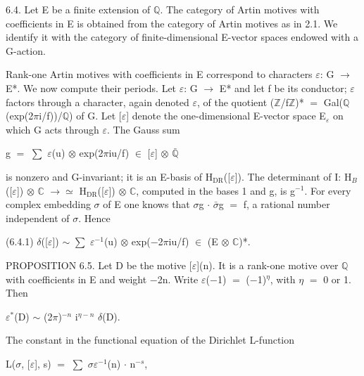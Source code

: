 \documentclass[10pt,twoside]{article}
\begin{document}
6.4. Let E be a finite extension of \ensuremath{ℚ}. The category of Artin motives with coefficients in E is obtained from the category of Artin motives as in 2.1. We identify it with the category of finite-dimensional E-vector spaces endowed with a G-action.\par
Rank-one Artin motives with coefficients in E correspond to characters \ensuremath{ε}: G \ensuremath{→} E*. We now compute their periods. Let \ensuremath{ε}: G \ensuremath{→} E* and let f be its conductor; \ensuremath{ε} factors through a character, again denoted \ensuremath{ε}, of the quotient (\ensuremath{ℤ}/f\ensuremath{ℤ})* \ensuremath{=} Gal(\ensuremath{ℚ}(exp(2\ensuremath{π}i/f))/\ensuremath{ℚ}) of G. Let [\ensuremath{ε}] denote the one-dimensional E-vector space E\ensuremath{_{ε}} on which G acts through \ensuremath{ε}. The Gauss sum\par
g \ensuremath{=} \ensuremath{∑} \ensuremath{ε}(u) \ensuremath{⊗} exp(2\ensuremath{π}iu/f) \ensuremath{∈} [\ensuremath{ε}] \ensuremath{⊗} \ensuremath{\bar{ℚ}}\par
is nonzero and G-invariant; it is an E-basis of H\ensuremath{_{\mathrm{DR}}}([\ensuremath{ε}]). The determinant of I: H\ensuremath{_{B}}([\ensuremath{ε}]) \ensuremath{⊗} \ensuremath{ℂ} \ensuremath{→}\ensuremath{≃} H\ensuremath{_{\mathrm{DR}}}([\ensuremath{ε}]) \ensuremath{⊗} \ensuremath{ℂ}, computed in the bases 1 and g, is g\ensuremath{^{-1}}. For every complex embedding \ensuremath{σ} of E one knows that \ensuremath{σ}g \ensuremath{·} \ensuremath{\bar{σ}}g \ensuremath{=} f, a rational number independent of \ensuremath{σ}. Hence\par
(6.4.1)    \ensuremath{δ}([\ensuremath{ε}]) \ensuremath{∼} \ensuremath{∑} \ensuremath{ε}\ensuremath{^{-1}}(u) \ensuremath{⊗} exp(\ensuremath{−}2\ensuremath{π}iu/f) \ensuremath{∈} (E \ensuremath{⊗} \ensuremath{ℂ})*.\par
PROPOSITION 6.5. Let D be the motive [\ensuremath{ε}](n). It is a rank-one motive over \ensuremath{ℚ} with coefficients in E and weight \ensuremath{−}2n. Write \ensuremath{ε}(\ensuremath{−}1) \ensuremath{=} (\ensuremath{−}1)\ensuremath{^{η}}, with \ensuremath{η} \ensuremath{=} 0 or 1. Then\par
\ensuremath{ε}\ensuremath{^{*}}(D) \ensuremath{∼} (2\ensuremath{π})\ensuremath{^{-n}} i\ensuremath{^{η−n}} \ensuremath{δ}(D).\par
The constant in the functional equation of the Dirichlet L-function\par
L(\ensuremath{σ}, [\ensuremath{ε}], s) \ensuremath{=} \ensuremath{∑} \ensuremath{σ}\ensuremath{ε}\ensuremath{^{-1}}(n) \ensuremath{·} n\ensuremath{^{-s}},\par
\end{document}
